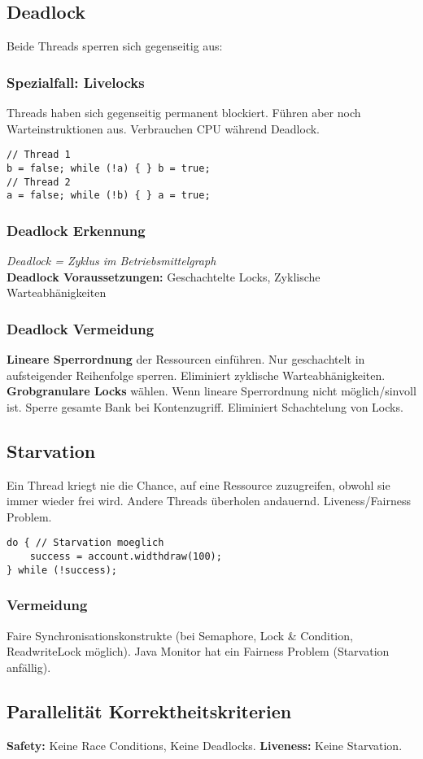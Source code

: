 \subsection{Deadlock}
Beide Threads sperren sich gegenseitig aus:

\subsubsection{Spezialfall: Livelocks}
Threads haben sich gegenseitig permanent blockiert. Führen aber noch Warteinstruktionen aus.
Verbrauchen CPU während Deadlock.
\begin{lstlisting}
// Thread 1
b = false; while (!a) { } b = true;
// Thread 2
a = false; while (!b) { } a = true;
\end{lstlisting}

\subsubsection{Deadlock Erkennung}
\textit{Deadlock = Zyklus im Betriebsmittelgraph}\\ 
\textbf{Deadlock Voraussetzungen:} Geschachtelte Locks, Zyklische Warteabhänigkeiten

\subsubsection{Deadlock Vermeidung}
\textbf{Lineare Sperrordnung} der Ressourcen einführen. 
Nur geschachtelt in aufsteigender Reihenfolge sperren. 
Eliminiert zyklische Warteabhänigkeiten.\\ 
\textbf{Grobgranulare Locks} wählen.
Wenn lineare Sperrordnung nicht möglich/sinvoll ist.
Sperre gesamte Bank bei Kontenzugriff.
Eliminiert Schachtelung von Locks.

\subsection{Starvation}
Ein Thread kriegt nie die Chance, auf eine Ressource zuzugreifen, obwohl sie immer wieder frei wird.
Andere Threads überholen andauernd. Liveness/Fairness Problem.
\begin{lstlisting}
do { // Starvation moeglich 
    success = account.widthdraw(100);
} while (!success);
\end{lstlisting}

\subsubsection{Vermeidung}
Faire Synchronisationskonstrukte (bei Semaphore, Lock \& Condition, ReadwriteLock möglich).
Java Monitor hat ein Fairness Problem (Starvation anfällig).

\subsection{Parallelität Korrektheitskriterien}
\textbf{Safety:} Keine Race Conditions, Keine Deadlocks.
\textbf{Liveness:} Keine Starvation.